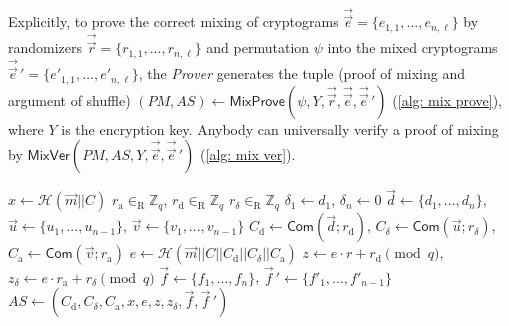 Explicitly, to prove the correct mixing of cryptograms $\vec{\vec{e}} = \{ e_{1, 1}, ..., e_{n, \ell} \}$ by randomizers $\vec{\vec{r}} = \{ r_{1, 1}, ..., r_{n, \ell} \}$ and permutation $\psi$ into the mixed cryptograms $\vec{\vec{e}}\,' = \{ e'_{1, 1}, ..., e'_{n, \ell} \}$, the \textit{Prover} generates the tuple (proof of mixing and argument of shuffle) $(PM, AS) \gets \mathsf{MixProve}(\psi, Y, \vec{\vec{r}}, \vec{\vec{e}}, \vec{\vec{e}}\,')$ (\cref{alg: mix prove}), where $Y$ is the encryption key. Anybody can universally verify a proof of mixing by $\mathsf{MixVer}(PM, AS, Y, \vec{\vec{e}}, \vec{\vec{e}}\,')$ (\cref{alg: mix ver}).

\begin{algorithm}[ht]
    \DontPrintSemicolon
    \caption{$\mathsf{ASKCProve}(\psi; r; \vec{m}; C)$}
    \label{alg: askc prove}
    
    $x \gets \mathcal{H}(\vec{m} || C)$ \;
    $r_\mathrm{a} \in_\mathrm{R} \mathbb{Z}_q$, $r_\mathrm{d} \in_\mathrm{R} \mathbb{Z}_q$ $r_\delta \in_\mathrm{R} \mathbb{Z}_q$ \;
    $\delta_1 \gets d_1$, $\delta_n \gets 0$ \;
    $\vec{d} \gets \{ d_1, ..., d_n \}$, $\vec{u} \gets \{ u_1, ..., u_{n-1} \}$, $\vec{v} \gets \{ v_1, ..., v_{n-1} \}$ \;
    $C_\mathrm{d} \gets \mathsf{Com} (\vec{d}; r_\mathrm{d})$, $C_\delta \gets \mathsf{Com} (\vec{u}; r_\delta)$, $C_\mathrm{a} \gets \mathsf{Com} (\vec{v}; r_\mathrm{a})$ \;
    $e \gets \mathcal{H}(\vec{m} || C || C_\mathrm{d} || C_\delta || C_\mathrm{a})$ \;
    $z \gets e \cdot r + r_\mathrm{d} \pmod q$, $z_\delta \gets e \cdot r_\mathrm{a} + r_\delta \pmod q$ \;
    $\vec{f} \gets \{ f_1, ..., f_n \}$, $\vec{f}\,' \gets \{ f'_1, ..., f'_{n-1} \}$ \;
    $AS \gets (C_\mathrm{d}, C_\delta, C_\mathrm{a}, x, e, z, z_\delta, \vec{f}, \vec{f}\,')$ \;
     
\end{algorithm}

